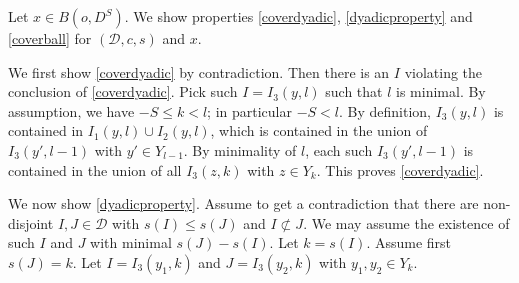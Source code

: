 Let $x\in B(o, D^S)$. We show properties
\eqref{coverdyadic},
\eqref{dyadicproperty} and
\eqref{coverball}
for $(\mathcal{D},c,s)$ and $x$.

We first show \eqref{coverdyadic} by contradiction. Then there is an $I$ violating the conclusion of
\eqref{coverdyadic}. Pick such $I=I_3(y,l)$ such that $l$ is minimal.
{By assumption, we have $-S\le k<l$; in particular $-S<l$}.
By definition, $I_3(y, l)$ is contained in $I_1(y, l)\cup I_2(y, l)$, which is contained in the union of $I_3(y',l-1)$ with $y'\in Y_{l-1}$.
By minimality of $l$, each such $I_3(y',l-1)$ is contained in the union of
all $I_3(z,k)$ with $z\in Y_k$. This proves \eqref{coverdyadic}.

We now show \eqref{dyadicproperty}. Assume to get a contradiction that
there are non-disjoint $I, J\in \mathcal{D}$ with $s(I)\le s(J)$
and $I \not \subset J$. We may assume the existence of such $I$ and $J$ with minimal
$s(J)-s(I)$. Let $k=s(I)$. Assume first $s(J)=k$. Let $I=I_3(y_1,k)$ and $J=I_3(y_2,k)$ with $y_1,y_2\in Y_k$.
